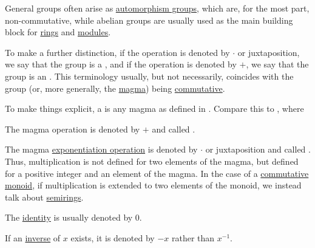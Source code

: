 \begin{remark}\label{rem:additive_magma}
  General groups often arise as \hyperref[def:automorphism_group]{automorphism groups}, which are, for the most part, non-commutative, while abelian groups are usually used as the main building block for \hyperref[def:semiring/ring]{rings} and \hyperref[def:left_module]{modules}.

  To make a further distinction, if the operation is denoted by \( \cdot \) or juxtaposition, we say that the group is a , and if the operation is denoted by \( + \), we say that the group is an . This terminology usually, but not necessarily, coincides with the group (or, more generally, the \hyperref[def:magma]{magma}) being \hyperref[def:magma/commutative]{commutative}.

  To make things explicit, a  is any magma as defined in . Compare this to , where
  \begin{thmenum}
     The magma operation is denoted by \( + \) and called .

     The magma \hyperref[def:magma/exponentiation]{exponentiation operation} is denoted by \( \cdot \) or juxtaposition and called . Thus, multiplication is not defined for two elements of the magma, but defined for a positive integer and an element of the magma. In the case of a \hyperref[def:magma/commutative]{commutative} \hyperref[def:unital_magma/monoid]{monoid}, if multiplication is extended to two elements of the monoid, we instead talk about \hyperref[def:semiring]{semirings}.

     The \hyperref[def:magma_identity]{identity} is usually denoted by \( 0 \).

     If an \hyperref[def:unital_magma_inverse_element]{inverse} of \( x \) exists, it is denoted by \( -x \) rather than \( x^{-1} \).
  \end{thmenum}
\end{remark}

